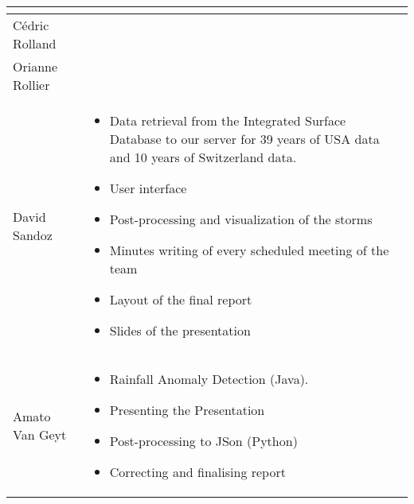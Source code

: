 \begin{tabular}{|l|p{10.5cm}|}
\begin{itemize}
\end{itemize}\\
\hline
Cédric Rolland &  \\
\hline
Orianne Rollier & \\
\hline
David Sandoz &
\begin{itemize}
	\item Data retrieval from the Integrated Surface Database to our server for 39 years of USA data and 10 years of Switzerland data.
	\item User interface
	\item Post-processing and visualization of the storms
	\item Minutes writing of every scheduled meeting of the team
	\item Layout of the final report
	\item Slides of the presentation
\end{itemize}\\
\hline
Amato Van Geyt & \begin{itemize}
	\item Rainfall Anomaly Detection (Java).
	\item Presenting the Presentation
	\item Post-processing to JSon (Python)
	\item Correcting and finalising report
\end{itemize}\\ 
\hline
\end{tabular}
